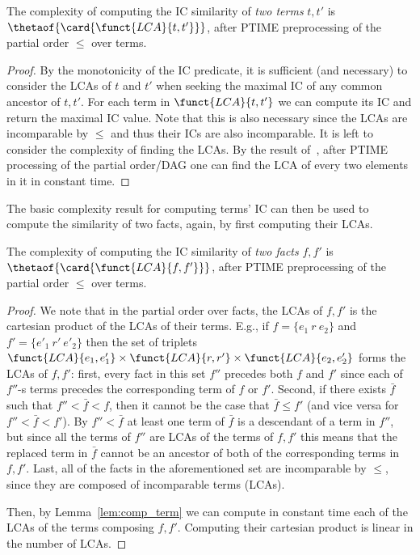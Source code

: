 \begin{lemma}
\label{lem:comp_term}
The complexity of computing the IC similarity of \emph{two terms} $t,t'$ is $\thetaof{\card{\funct{LCA}{t,t'}}}$, after PTIME preprocessing of the partial order $\leq$ over terms.
\end{lemma}
\begin{proof}
By the monotonicity of the IC predicate, it is sufficient (and necessary) to consider the LCAs of $t$ and $t'$ when seeking the maximal IC of any common ancestor of $t,t'$. For each term in $\funct{LCA}{t,t'}$ we can compute its IC and return the maximal IC value. Note that this is also necessary since the LCAs are incomparable by $\leq$ and thus their ICs are also incomparable. It is left to consider the complexity of finding the LCAs. By the result of~\cite{bender2001finding}, after PTIME processing of the partial order/DAG one can find the LCA of every two elements in it in constant time.
\end{proof}

The basic complexity result for computing terms' IC can then be used to compute the similarity of two facts, again, by first computing their LCAs.

\begin{lemma}
\label{lem:comp_fact}
The complexity of computing the IC similarity of \emph{two facts} $f,f'$ is $\thetaof{\card{\funct{LCA}{f,f'}}}$, after PTIME preprocessing of the partial order $\leq$ over terms.
\end{lemma}
\begin{proof}
We note that in the partial order over facts, the LCAs of $f,f'$ is the cartesian product of the LCAs of their terms. E.g., if $f=\{e_1~ r~ e_2\}$ and $f'=\{e'_1~ r'~ e'_2\}$ then the set of triplets $\funct{LCA}{e_1,e'_1}\times \funct{LCA}{r,r'}\times \funct{LCA}{e_2,e'_2}$ forms the LCAs of $f,f'$: first, every fact in this set $f''$ precedes both $f$ and $f'$ since each of $f''$-s terms precedes the corresponding term of $f$ or $f'$. Second, if there exists $\bar{f}$ such that $f''<\bar{f}<f$, then it cannot be the case that $\bar{f}\leq f'$ (and vice versa for $f''<\bar{f}<f'$). By $f''<\bar{f}$ at least one term of $\bar{f}$ is a descendant of a term in $f''$, but since all the terms of $f''$ are LCAs of the terms of $f,f'$ this means that the replaced term in $\bar{f}$ cannot be an ancestor of both of the corresponding terms in $f,f'$. Last, all of the facts in the aforementioned set are incomparable by $\leq$, since they are composed of incomparable terms (LCAs).

Then, by Lemma~\ref{lem:comp_term} we can compute in constant time each of the LCAs of the terms composing $f,f'$. Computing their cartesian product is linear in the number of LCAs.
\end{proof}

